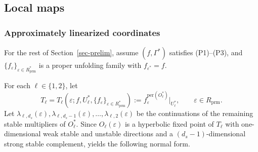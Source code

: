 \documentclass[11pt,a4paper]{article}
\theoremstyle{plain}
\theoremstyle{definition}
\theoremstyle{plain}
\numberwithin{equation}{section}
\begin{document}
\subsection{Local maps}

\subsubsection{Approximately linearized coordinates}

For the rest of Section~\ref{sec-prelim}, assume $(f,\Gamma^*)$ satisfies \textup{(P1)}--\textup{(P3)}, and $\{f_\varepsilon\}_{\varepsilon \in R_\mathrm{prm}^*}$ is a proper unfolding family with $f_{\varepsilon^*} = f$.

For each $\ell \in \{1,2\}$, let
\[
T_\ell = T_\ell(\varepsilon; f, U_\ell^*, \{ f_\varepsilon \}_{\varepsilon \in R_\mathrm{prm}^*}) := f_\varepsilon^{\mathrm{per}(O_\ell^*)}|_{U_\ell^*},
\qquad
\varepsilon \in R_\mathrm{prm}.
\]
Let $\lambda_{\ell,d_s}(\varepsilon),\lambda_{\ell,d_s-1}(\varepsilon),\dots,\lambda_{\ell,2}(\varepsilon)$ be the continuations of the remaining stable multipliers of $O_\ell^*$. Since $O_\ell(\varepsilon)$ is a hyperbolic fixed point of $T_\ell$ with one-dimensional weak stable and unstable directions and a $(d_s - 1)$-dimensional strong stable complement, \cite[Lemma~6]{GST2008} yields the following normal form.
\end{document}
